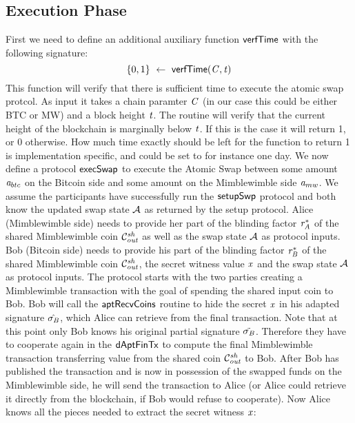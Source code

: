 \subsection{Execution Phase}\label{subsec:atom:exec}

First we need to define an additional auxiliary function $\mathsf{verfTime}$ with the following signature:
\[ \{0,1\} ~\leftarrow~ \mathsf{verfTime} (\mathit{C},\mathit{t}) \]
This function will verify that there is sufficient time to execute the atomic swap protcol.
As input it takes a chain paramter $\mathit{C}$ (in our case this could be either BTC or MW) and a block height $\mathit{t}$.
The routine will verify that the current height of the blockchain is marginally below $\mathit{t}$.
If this is the case it will return 1, or 0 otherwise.
How much time exactly should be left for the function to return 1 is implementation specific, and could be set to for instance one day.
We now define a protocol $\mathsf{execSwap}$ to execute the Atomic Swap between some amount $\mathit{a}_{btc}$ on the Bitcoin side and some amount on the Mimblewimble side $\mathit{a}_{mw}$.
We assume the participants have successfully run the $\mathsf{setupSwp}$ protocol and both know the updated swap state $\mathcal{A}$ as returned by the setup protocol.
Alice (Mimblewimble side) needs to provide her part of the blinding factor $\mathit{r}_{\mathit{A}}^*$ of the shared Mimblewimble coin $\mathcal{C}_{\mathit{out}}^{\mathit{sh}}$ as well as the swap state $\mathcal{A}$ as protocol inputs.
Bob (Bitcoin side) needs to provide his part of the blinding factor $\mathit{r}_{\mathit{B}}^*$ of the shared Mimblewimble coin $\mathcal{C}_{\mathit{out}}^{\mathit{sh}}$, the secret witness value $\mathit{x}$ and the swap state $\mathcal{A}$ as protocol inputs.
The protocol starts with the two parties creating a Mimblewimble transaction with the goal of spending the shared input coin to Bob.
Bob will call the $\mathsf{aptRecvCoins}$ routine to hide the secret $\mathit{x}$ in his adapted signature $\hat{\sigma_{\mathit{B}}}$, which Alice can retrieve from the final transaction.
Note that at this point only Bob knows his original partial signature $\tilde{\sigma_{\mathit{B}}}$.
Therefore they have to cooperate again in the $\mathsf{dAptFinTx}$ to compute the final Mimblewimble transaction transferring value from the shared coin $\mathcal{C}_{\mathit{out}}^{\mathit{sh}}$ to Bob.
After Bob has published the transaction and is now in possession of the swapped funds on the Mimblewimble side, he will send the transaction to Alice (or Alice could retrieve it directly from the blockchain, if Bob would refuse to cooperate).
Now Alice knows all the pieces needed to extract the secret witness $\mathit{x}$:
